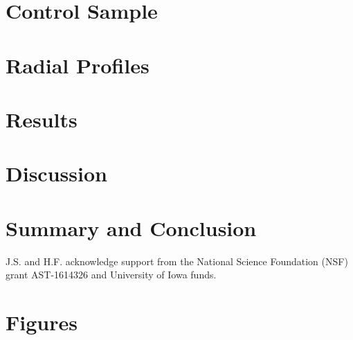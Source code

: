 \documentclass[iop,revtex4,twocolumn,apj,numberedappendix,appendixfloats]{emulateapj}
\begin{document}
\section{Control Sample}\label{sec:control}


\section{Radial Profiles}\label{sec:radial}


\section{Results}\label{sec:results}


\section{Discussion}\label{sec:discussion}


\section{Summary and Conclusion}\label{sec:sum}






\acknowledgments

J.S. and H.F. acknowledge support from the National Science Foundation (NSF) grant AST-1614326 and University of Iowa funds. 





\hbox{}\clearpage

\appendix

\section{Figures}
\end{document}
